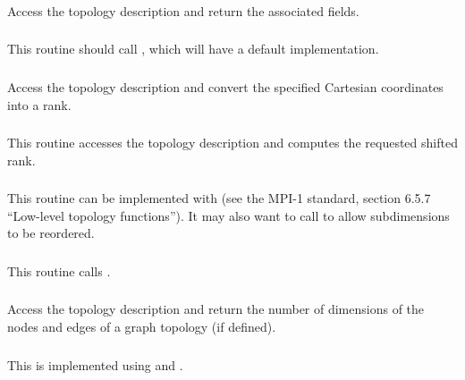 \documentclass{article}
\begin{document}
\subsubsection{}
Access the topology description and return the associated fields.

\subsubsection{}
This routine should call , which will have a default
implementation.  

\subsubsection{}
Access the topology description and convert the specified Cartesian
coordinates into a rank.

\subsubsection{}
This routine accesses the topology description and computes the requested
shifted rank.

\subsubsection{}
This routine can be implemented with  (see the MPI-1
standard, section 6.5.7 ``Low-level topology functions'').  It may also
want to call  to allow subdimensions to be reordered.

\subsubsection{}
This routine calls .

\subsubsection{}
Access the topology description and return the number of dimensions of
the nodes and edges of a graph topology (if defined).

\subsubsection{}
This is implemented using  and
. 
\end{document}
